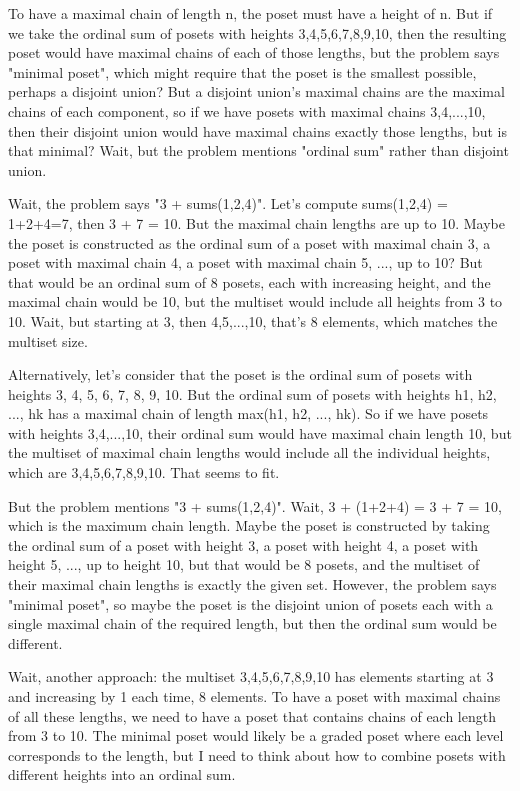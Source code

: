 To have a maximal chain of length n, the poset must have a height of n. But if we take the ordinal sum of posets with heights 3,4,5,6,7,8,9,10, then the resulting poset would have maximal chains of each of those lengths, but the problem says "minimal poset", which might require that the poset is the smallest possible, perhaps a disjoint union? But a disjoint union's maximal chains are the maximal chains of each component, so if we have posets with maximal chains 3,4,...,10, then their disjoint union would have maximal chains exactly those lengths, but is that minimal? Wait, but the problem mentions "ordinal sum" rather than disjoint union. 

Wait, the problem says "3 + sums({1,2,4})". Let's compute sums({1,2,4}) = 1+2+4=7, then 3 + 7 = 10. But the maximal chain lengths are up to 10. Maybe the poset is constructed as the ordinal sum of a poset with maximal chain 3, a poset with maximal chain 4, a poset with maximal chain 5, ..., up to 10? But that would be an ordinal sum of 8 posets, each with increasing height, and the maximal chain would be 10, but the multiset would include all heights from 3 to 10. Wait, but starting at 3, then 4,5,...,10, that's 8 elements, which matches the multiset size. 

Alternatively, let's consider that the poset is the ordinal sum of posets with heights 3, 4, 5, 6, 7, 8, 9, 10. But the ordinal sum of posets with heights h1, h2, ..., hk has a maximal chain of length max(h1, h2, ..., hk). So if we have posets with heights 3,4,...,10, their ordinal sum would have maximal chain length 10, but the multiset of maximal chain lengths would include all the individual heights, which are 3,4,5,6,7,8,9,10. That seems to fit. 

But the problem mentions "3 + sums({1,2,4})". Wait, 3 + (1+2+4) = 3 + 7 = 10, which is the maximum chain length. Maybe the poset is constructed by taking the ordinal sum of a poset with height 3, a poset with height 4, a poset with height 5, ..., up to height 10, but that would be 8 posets, and the multiset of their maximal chain lengths is exactly the given set. However, the problem says "minimal poset", so maybe the poset is the disjoint union of posets each with a single maximal chain of the required length, but then the ordinal sum would be different. 

Wait, another approach: the multiset {3,4,5,6,7,8,9,10} has elements starting at 3 and increasing by 1 each time, 8 elements. To have a poset with maximal chains of all these lengths, we need to have a poset that contains chains of each length from 3 to 10. The minimal poset would likely be a graded poset where each level corresponds to the length, but I need to think about how to combine posets with different heights into an ordinal sum. 

